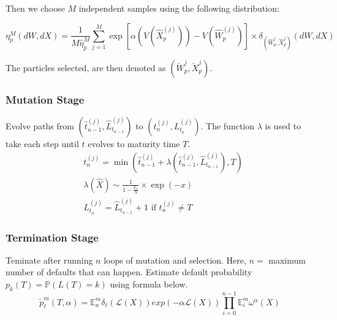 Then we choose $M$ independent samples using the following distribution:

\begin{equation}
	\eta_{p}^{M} (dW,dX) = \frac{1}{M \hat{\eta}_{p}^{M}} \sum_{j=1}^{M} 
	\exp \left[ \alpha \left( V(\hat{X}_{p}^{(j)}) \right) - V(\hat{W}^{(j)}_{p}) 
	\right] \times \delta_{(\hat{W}_p^{j},\hat{X}_p^{j})} (dW,dX)
\end{equation}

The particles selected, are then denoted as $(\breve{W}_p^{j},\breve{X}_p^{j})$.

\subsubsection{Mutation Stage}
Evolve paths from $\left( \hat{t}_{n-1}^{(j)}, \hat{L}_{t_{n-1}}^{(j)}\right)$ to $\left(t^{(j)}_{n}, L_{t_{n}}^{(j)} \right)$.
The function $\lambda$ is used to take each step until $t$ evolves to maturity time $T$. 
		\begin{equation*}
				\begin{split}
					&t^{(j)}_{n}= \min\left(\hat{t}^{(j)}_{n-1} + \lambda\left(\hat{t}^{(j)}_{n-1},\hat{L}_{t_{n-1}}^{(j)}\right),T\right) \\
					& \lambda\left(\hat{X}\right) \sim \frac{1}{1-\frac{L_{t}}{N}} \times \exp(-x) \\
					&L_{t_{n}}^{(j)} = \hat{L}_{t_{n-1}}^{(j)} + 1 \text{ if } t^{(j)}_{n} 		\neq T					
				\end{split}	
		\end{equation*}

\subsubsection{Termination Stage}
Teminate after running $n$ loops of mutation and selection. Here, $n =$ maximum number of defaults that can happen.
 Estimate default probability $p_k(T) = \mathbb{P}\left( L\left( T \right) = k
		      \right)$ using formula below.
\begin{equation*}
	\tilde{p}^m_{\ell}(T,\alpha) = \mathbb{E}^{m}_{n}{\delta_{\ell}(\mathcal{L}(X))exp(-\alpha \mathcal{L}(X))}\prod_{i=0}^{n-1}\mathbb{E}_{i}^{m}\omega^{\alpha}(X)
\end{equation*}
